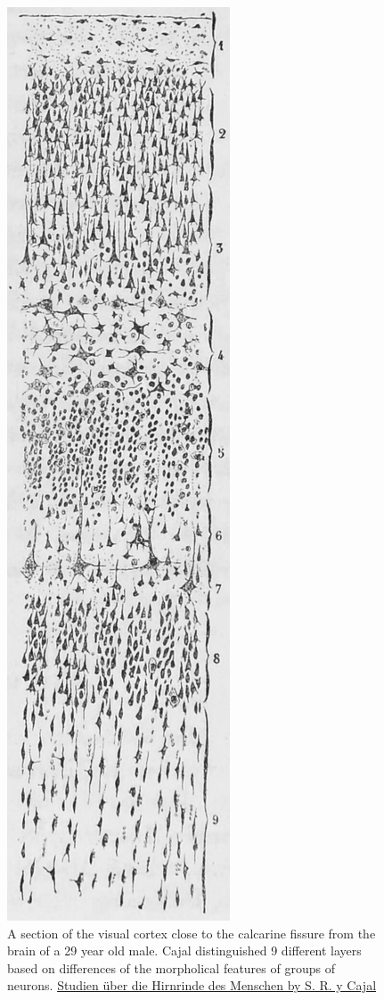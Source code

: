 \begin{figure}

{\centering \includegraphics[width=0.7\linewidth]{./figures/cns/cajal_shm_fig1} 

}

\caption{A section of the visual cortex close to the calcarine fissure from the brain of a 29 year old male. Cajal distinguished 9 different layers based on differences of the morpholical features of groups of neurons. \href{https://wellcomelibrary.org/item/b28084585}{Studien über die Hirnrinde des Menschen by S. R. y Cajal}}\label{fig:cajallayers}
\end{figure}

